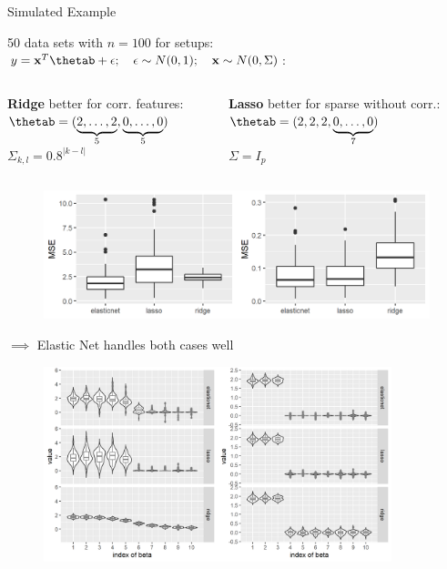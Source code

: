 \documentclass[11pt,compress,t,notes=noshow, xcolor=table]{beamer}
\begin{document}
\begin{vbframe} {Simulated Example}

\footnotesize
50 data sets with $n=100$ for setups: $y =\xv^T \thetab + \epsilon; \quad \epsilon \sim N(0,1);
  \quad \xv \sim N(0, \Sigma)$: 
\vspace{-0.3cm}
\begin{columns}
\begin{column}{0.5\textwidth}
\begin{center}
{\footnotesize \textbf{Ridge} better for corr. features}: \\ 
$\thetab=(\underbrace{2,\ldots,2}_{5},\underbrace{0,\ldots,0}_{5})$\\
$ \Sigma_{k,l}=0.8^{|k-l|}$ 
  \end{center}
\end{column}
\begin{column}{0.5\textwidth} 
\begin{center}
{\footnotesize \textbf{Lasso} better for sparse without corr.:} \\
$\thetab=(2, 2, 2,\underbrace{0,\ldots,0}_{7})$ \\
$ \Sigma = I_p$ 
\end{center}
\end{column}
\end{columns}

\begin{figure}
\includegraphics[width=\textwidth]{figure/enet_lasso_ridge_mse.png}\\
\end{figure}
{\normalsize $\implies$ Elastic Net handles both cases well}
\framebreak

\begin{figure}
\includegraphics[width=0.9\textwidth]{figure/enet_tradeoff.png}\\
\end{figure}



\end{vbframe}
\end{document}
